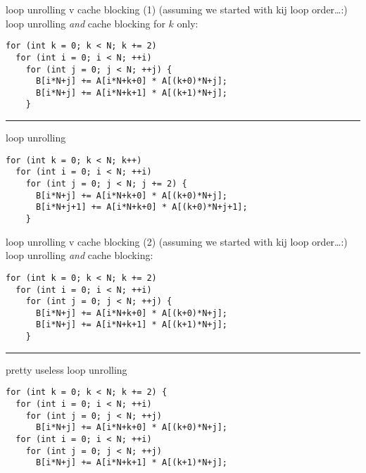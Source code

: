 \begin{frame}[fragile,label=loopUnrollVCacheBlocking1]{loop unrolling v cache blocking (1)}
\lstset{
    style=small,language=C
}
(assuming we started with kij loop order\ldots:) \\
loop unrolling \textit{and} cache blocking for $k$ only:
\begin{lstlisting}
for (int k = 0; k < N; k += 2)
  for (int i = 0; i < N; ++i)
    for (int j = 0; j < N; ++j) {
      B[i*N+j] += A[i*N+k+0] * A[(k+0)*N+j];
      B[i*N+j] += A[i*N+k+1] * A[(k+1)*N+j];
    }
\end{lstlisting}
\hrule
loop unrolling
\begin{lstlisting}
for (int k = 0; k < N; k++)
  for (int i = 0; i < N; ++i)
    for (int j = 0; j < N; j += 2) {
      B[i*N+j] += A[i*N+k+0] * A[(k+0)*N+j];
      B[i*N+j+1] += A[i*N+k+0] * A[(k+0)*N+j+1];
    }
\end{lstlisting}
\end{frame}

\begin{frame}[fragile,label=loopUnrollVCacheBlocking2]{loop unrolling v cache blocking (2)}
\lstset{
    style=smaller,language=C
}
(assuming we started with kij loop order\ldots:) \\
loop unrolling \textit{and} cache blocking:
\begin{lstlisting}
for (int k = 0; k < N; k += 2)
  for (int i = 0; i < N; ++i)
    for (int j = 0; j < N; ++j) {
      B[i*N+j] += A[i*N+k+0] * A[(k+0)*N+j];
      B[i*N+j] += A[i*N+k+1] * A[(k+1)*N+j];
    }
\end{lstlisting}
\hrule
pretty useless loop unrolling
\begin{lstlisting}
for (int k = 0; k < N; k += 2) {
  for (int i = 0; i < N; ++i)
    for (int j = 0; j < N; ++j)
      B[i*N+j] += A[i*N+k+0] * A[(k+0)*N+j];
  for (int i = 0; i < N; ++i)
    for (int j = 0; j < N; ++j)
      B[i*N+j] += A[i*N+k+1] * A[(k+1)*N+j];
\end{lstlisting}
\end{frame}
